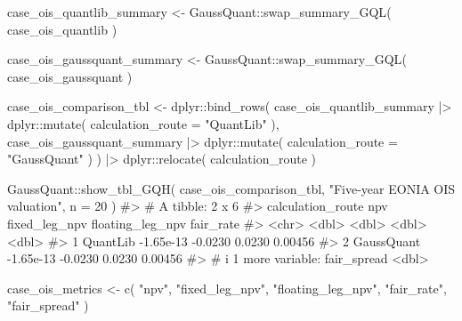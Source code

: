 \documentclass[
  letterpaper,
  DIV=11,
  numbers=noendperiod]{scrreprt}
\newenvironment{Shaded}{\begin{snugshade}}{\end{snugshade}}
\newcommand{\AttributeTok}[1]{\textcolor[rgb]{0.40,0.45,0.13}{#1}}
\newcommand{\CommentTok}[1]{\textcolor[rgb]{0.37,0.37,0.37}{#1}}
\newcommand{\DecValTok}[1]{\textcolor[rgb]{0.68,0.00,0.00}{#1}}
\newcommand{\FunctionTok}[1]{\textcolor[rgb]{0.28,0.35,0.67}{#1}}
\newcommand{\NormalTok}[1]{\textcolor[rgb]{0.00,0.23,0.31}{#1}}
\newcommand{\OtherTok}[1]{\textcolor[rgb]{0.00,0.23,0.31}{#1}}
\newcommand{\SpecialCharTok}[1]{\textcolor[rgb]{0.37,0.37,0.37}{#1}}
\newcommand{\StringTok}[1]{\textcolor[rgb]{0.13,0.47,0.30}{#1}}
\begin{document}
\begin{Shaded}
\begin{Highlighting}[]
\NormalTok{case\_ois\_quantlib\_summary }\OtherTok{\textless{}{-}}\NormalTok{ GaussQuant}\SpecialCharTok{::}\FunctionTok{swap\_summary\_GQL}\NormalTok{(}
\NormalTok{  case\_ois\_quantlib}
\NormalTok{)}

\NormalTok{case\_ois\_gaussquant\_summary }\OtherTok{\textless{}{-}}\NormalTok{ GaussQuant}\SpecialCharTok{::}\FunctionTok{swap\_summary\_GQL}\NormalTok{(}
\NormalTok{  case\_ois\_gaussquant}
\NormalTok{)}

\NormalTok{case\_ois\_comparison\_tbl }\OtherTok{\textless{}{-}}\NormalTok{ dplyr}\SpecialCharTok{::}\FunctionTok{bind\_rows}\NormalTok{(}
\NormalTok{  case\_ois\_quantlib\_summary }\SpecialCharTok{|\textgreater{}}
\NormalTok{    dplyr}\SpecialCharTok{::}\FunctionTok{mutate}\NormalTok{(}
      \AttributeTok{calculation\_route =} \StringTok{"QuantLib"}
\NormalTok{    ),}
\NormalTok{  case\_ois\_gaussquant\_summary }\SpecialCharTok{|\textgreater{}}
\NormalTok{    dplyr}\SpecialCharTok{::}\FunctionTok{mutate}\NormalTok{(}
      \AttributeTok{calculation\_route =} \StringTok{"GaussQuant"}
\NormalTok{    )}
\NormalTok{) }\SpecialCharTok{|\textgreater{}}
\NormalTok{  dplyr}\SpecialCharTok{::}\FunctionTok{relocate}\NormalTok{(}
\NormalTok{    calculation\_route}
\NormalTok{  )}

\NormalTok{GaussQuant}\SpecialCharTok{::}\FunctionTok{show\_tbl\_GQH}\NormalTok{(}
\NormalTok{  case\_ois\_comparison\_tbl,}
  \StringTok{"Five{-}year EONIA OIS valuation"}\NormalTok{,}
  \AttributeTok{n =} \DecValTok{20}
\NormalTok{)}
\CommentTok{\#\textgreater{} \# A tibble: 2 x 6}
\CommentTok{\#\textgreater{}   calculation\_route       npv fixed\_leg\_npv floating\_leg\_npv fair\_rate}
\CommentTok{\#\textgreater{}   \textless{}chr\textgreater{}                 \textless{}dbl\textgreater{}         \textless{}dbl\textgreater{}            \textless{}dbl\textgreater{}     \textless{}dbl\textgreater{}}
\CommentTok{\#\textgreater{} 1 QuantLib          {-}1.65e{-}13       {-}0.0230           0.0230   0.00456}
\CommentTok{\#\textgreater{} 2 GaussQuant        {-}1.65e{-}13       {-}0.0230           0.0230   0.00456}
\CommentTok{\#\textgreater{} \# i 1 more variable: fair\_spread \textless{}dbl\textgreater{}}

\NormalTok{case\_ois\_metrics }\OtherTok{\textless{}{-}} \FunctionTok{c}\NormalTok{(}
  \StringTok{"npv"}\NormalTok{,}
  \StringTok{"fixed\_leg\_npv"}\NormalTok{,}
  \StringTok{"floating\_leg\_npv"}\NormalTok{,}
  \StringTok{"fair\_rate"}\NormalTok{,}
  \StringTok{"fair\_spread"}
\NormalTok{)}


\end{Highlighting}
\end{Shaded}
\end{document}
